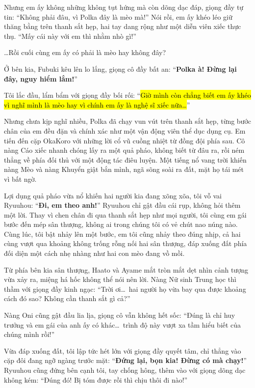 \documentclass[../main.tex]{subfiles}
\begin{document}
Nhưng em ấy không những không tụt hứng mà còn dõng dạc đáp, giọng đầy tự tin: ``Không phải đâu, vì Polka đây là mèo mà!'' Nói rồi, em ấy khéo léo giữ thăng bằng trên thanh sắt hẹp, hai tay dang rộng như một diễn viên xiếc thực thụ. ``Mấy cái này với em thì nhằm nhò gì!''

\dots Rồi cuối cùng em ấy có phải là mèo hay không đây?


Ở bên kia, Fubuki kêu lên lo lắng, giọng cô đầy bất an: ``\textbf{Polka à! Đừng lại đây, nguy hiểm lắm!}''

Tôi lắc đầu, lẩm bẩm với giọng đầy bối rối: ``\hl{Giờ mình còn chẳng biết em ấy khéo vì nghĩ mình là mèo hay vì chính em ấy là nghệ sĩ xiếc nữa\dots}''

Nhưng chưa kịp nghĩ nhiều, Polka đã chạy vun vút trên thanh sắt hẹp, từng bước chân của em đều đặn và chính xác như một vận động viên thể dục dụng cụ. Em tiến đến cặp OkaKoro với những lời cổ vũ cuồng nhiệt từ đồng đội phía sau. Cô nàng Cáo xiếc nhanh chóng lấy ra một quả pháo, không biết từ đâu ra, rồi ném thẳng về phía đối thủ với một động tác điêu luyện. Một tiếng nổ vang trời khiến nàng Mèo và nàng Khuyển giật bắn mình, ngã sõng soài ra đất, mặt họ tái mét vì bất ngờ.


Lợi dụng quả pháo vừa nổ khiến hai người kia đang xõng xõa, tôi vỗ vai Ryuuhou: ``\textbf{Đi, em theo anh!}'' Ryuuhou chỉ gật đầu cái rụp, không hỏi thêm một lời. Thay vì chen chân đi qua thanh sắt hẹp như mọi người, tôi cùng em gái bước đến mép sân thượng, không ai trong chúng tôi có vẻ chút nao núng nào. Cùng lúc, tôi bật nhảy lên một bước, em tôi cũng nhảy theo đúng nhịp, cả hai cùng vượt qua khoảng không trống rỗng nối hai sân thượng, đáp xuống đất phía đối diện một cách nhẹ nhàng như hai con mèo đang vồ mồi.

Từ phía bên kia sân thượng, Haato và Ayame mắt tròn mắt dẹt nhìn cảnh tượng vừa xảy ra, miệng há hốc không thể nói nên lời. Nàng Nữ sinh Trung học thì thầm với giọng đầy kinh ngạc: ``Trời ơi\dots\ hai người họ vừa bay qua được khoảng cách đó sao? Không cần thanh sắt gì cả?''

Nàng Oni cũng gật đầu lia lịa, giọng cô vẫn không hết sốc: ``Đúng là chỉ huy trưởng và em gái của anh ấy có khác\dots\ trình độ này vượt xa tầm hiểu biết của chúng mình rồi!''

Vừa đáp xuống đất, tôi lập tức hét lớn với giọng đầy quyết tâm, chỉ thẳng vào cặp đôi đang ngỡ ngàng trước mặt: ``\textbf{Đứng lại, bọn kia! Đừng có mà chạy!}'' Ryuuhou cũng đứng bên cạnh tôi, tay chống hông, thêm vào với giọng dõng dạc không kém: ``Đúng đó! Bị tóm được rồi thì chịu thôi đi nào!''
\end{document}
